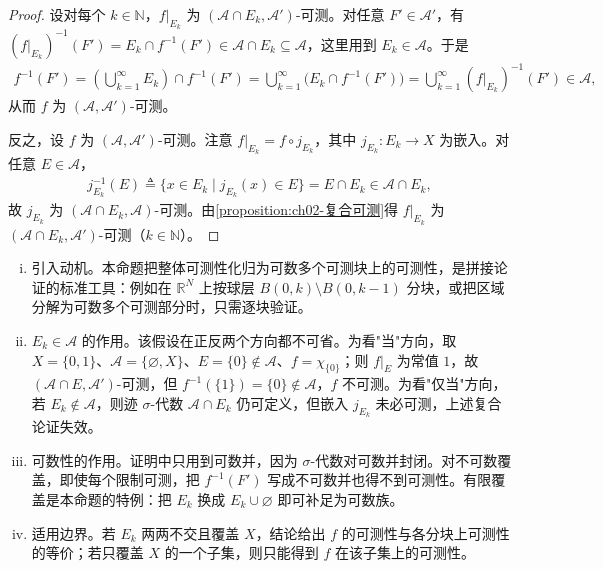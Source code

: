 \documentclass[../../main.tex]{subfiles}%
\begin{document}
\begin{proof}
设对每个 $k\in\mathbb{N}$，$f|_{E_k}$ 为 $(\mathscr A\cap E_k,\mathscr A')$-可测。对任意 $F'\in\mathscr A'$，有 $(f|_{E_k})^{-1}(F')=E_k\cap f^{-1}(F')\in\mathscr A\cap E_k\subseteq\mathscr A$，这里用到 $E_k\in\mathscr A$。于是
\begin{align*}
f^{-1}(F')=\left(\bigcup_{k=1}^\infty E_k\right)\cap f^{-1}(F')
=\bigcup_{k=1}^\infty\bigl(E_k\cap f^{-1}(F')\bigr)
=\bigcup_{k=1}^\infty (f|_{E_k})^{-1}(F')\in\mathscr A,
\end{align*}
从而 $f$ 为 $(\mathscr A,\mathscr A')$-可测。

反之，设 $f$ 为 $(\mathscr A,\mathscr A')$-可测。注意 $f|_{E_k}=f\circ j_{E_k}$，其中 $j_{E_k}:E_k\to X$ 为嵌入。对任意 $E\in\mathscr A$，
\begin{align*}
j_{E_k}^{-1}(E)\triangleq \{x\in E_k\mid j_{E_k}(x)\in E\}=E\cap E_k\in\mathscr A\cap E_k,
\end{align*}
故 $j_{E_k}$ 为 $(\mathscr A\cap E_k,\mathscr A)$-可测。由\cref{proposition:ch02-复合可测}得 $f|_{E_k}$ 为 $(\mathscr A\cap E_k,\mathscr A')$-可测（$k\in\mathbb{N}$）。
\end{proof}

\begin{remark}\label{remark:ch02-限制可测}
\begin{enumerate}[(i)]
\item 引入动机。本命题把整体可测性化归为可数多个可测块上的可测性，是拼接论证的标准工具：例如在 $\mathbb{R}^N$ 上按球层 $B(0,k)\setminus B(0,k-1)$ 分块，或把区域分解为可数多个可测部分时，只需逐块验证。
\item $E_k\in\mathscr A$ 的作用。该假设在正反两个方向都不可省。为看"当"方向，取 $X=\{0,1\}$、$\mathscr A=\{\varnothing,X\}$、$E=\{0\}\notin\mathscr A$、$f=\chi_{\{0\}}$；则 $f|_E$ 为常值 $1$，故 $(\mathscr A\cap E,\mathscr A')$-可测，但 $f^{-1}(\{1\})=\{0\}\notin\mathscr A$，$f$ 不可测。为看"仅当"方向，若 $E_k\notin\mathscr A$，则迹 $\sigma$-代数 $\mathscr A\cap E_k$ 仍可定义，但嵌入 $j_{E_k}$ 未必可测，上述复合论证失效。
\item 可数性的作用。证明中只用到可数并，因为 $\sigma$-代数对可数并封闭。对不可数覆盖，即使每个限制可测，把 $f^{-1}(F')$ 写成不可数并也得不到可测性。有限覆盖是本命题的特例：把 $E_k$ 换成 $E_k\cup\varnothing$ 即可补足为可数族。
\item 适用边界。若 $E_k$ 两两不交且覆盖 $X$，结论给出 $f$ 的可测性与各分块上可测性的等价；若只覆盖 $X$ 的一个子集，则只能得到 $f$ 在该子集上的可测性。
\end{enumerate}
\end{remark}
\end{document}
